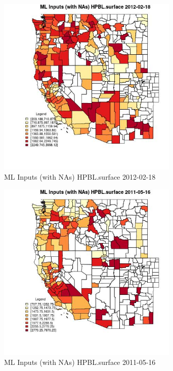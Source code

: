 \begin{figure} 
\centering  
\includegraphics[width=0.77\textwidth]{Code_Outputs/Report_ML_input_PM25_Step4_part_f_de_duplicated_aves_prioritize_24hr_obswNAs_CountyHPBLsurfaceMean2012-02-18.jpg} 
\caption{\label{fig:Report_ML_input_PM25_Step4_part_f_de_duplicated_aves_prioritize_24hr_obswNAsCountyHPBLsurfaceMean2012-02-18}ML Inputs (with NAs) HPBL.surface 2012-02-18} 
\end{figure} 
 

\begin{figure} 
\centering  
\includegraphics[width=0.77\textwidth]{Code_Outputs/Report_ML_input_PM25_Step4_part_f_de_duplicated_aves_prioritize_24hr_obswNAs_CountyHPBLsurfaceMean2011-05-16.jpg} 
\caption{\label{fig:Report_ML_input_PM25_Step4_part_f_de_duplicated_aves_prioritize_24hr_obswNAsCountyHPBLsurfaceMean2011-05-16}ML Inputs (with NAs) HPBL.surface 2011-05-16} 
\end{figure} 
 

